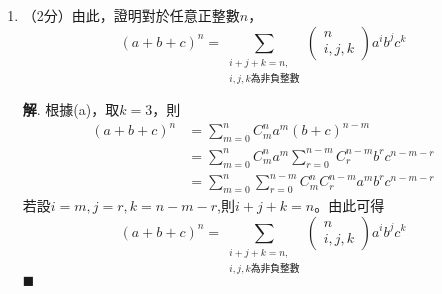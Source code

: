 \documentclass[12pt]{article}
\newenvironment*{sol}{\par \textbf{解}.}{\hfill$\blacksquare$}
\begin{document}
\begin{enumerate}
\begin{enumerate}
\begin{sol}
                假設$P(m)$對某正整數$m$成立，即若$x_1+x_2+\cdots+x_m=n$，$$\begin{pmatrix}
                    n\\x_1,x_2,\dots,x_m
                \end{pmatrix}=C_{x_1}^n C_{x_2}^{n-x_1}\cdots C_{x_{m-1}}^{n-x_1-x_2-\cdots-x_{m-2}}$$

                當$k=m+1$時，$x_1+x_2+\cdots+x_m+x_{m+1}=n$，\begin{align*}
                    \textrm{左方}&=\begin{pmatrix}
                        n\\x_1,x_2,\dots,x_m,x_{m+1}
                    \end{pmatrix}\\&=\frac{n!}{x_1!x_2!\cdots x_m!x_{m+1}!}\\
                    &=\frac{n!}{x_1!(n-x_1)!}\begin{pmatrix}
                        n-x_1\\x_2,\dots,x_m,x_{m+1}
                    \end{pmatrix}\\
                    &=C_{x_1}^n C_{x_2}^{n-x_1} C_{x_3}^{n-x_1-x_2}\cdots C_{x_m}^{n-x_1-x_2-\cdots-x_{m-1}}\\
                    &=\textrm{右方}
                \end{align*}

                $\therefore$若$P(m)$成立，則$P(m+1)$成立。

                $\therefore$根據數學歸納法原理，$P(k)$對所有整數$k\geq 2$成立。
            \end{sol}
            \item （2分）由此，證明對於任意正整數$n$，$$(a+b+c)^n=\sum_{\substack{i+j+k=n, \\ i,j,k\textrm{為非負整數}}} \begin{pmatrix}
                n\\i,j,k
            \end{pmatrix}a^ib^jc^k$$\begin{sol}
                根據(a)，取$k=3$，則\begin{align*}
                    (a+b+c)^n&=\sum_{m=0}^{n}C_m^n a^m(b+c)^{n-m}\\
                    &=\sum_{m=0}^{n}C_m^n a^m\sum_{r=0}^{n-m}C_r^{n-m} b^r c^{n-m-r}\\
                    &=\sum_{m=0}^{n}\sum_{r=0}^{n-m}C_m^n C_r^{n-m} a^m b^r c^{n-m-r}
                \end{align*}
                若設$i=m,j=r,k=n-m-r$,則$i+j+k=n$。由此可得$$(a+b+c)^n=\sum_{\substack{i+j+k=n, \\ i,j,k\textrm{為非負整數}}} \begin{pmatrix}
                    n\\i,j,k
                \end{pmatrix}a^ib^jc^k$$
            \end{sol}
        \end{enumerate}
    \end{enumerate}
\end{document}
